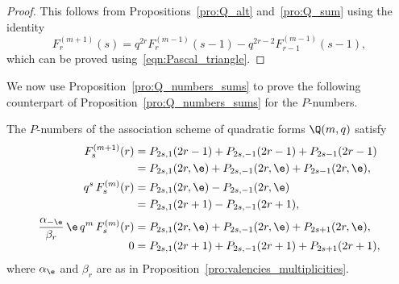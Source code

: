 \begin{proof}
This follows from Propositions~\ref{pro:Q_alt} and~\ref{pro:Q_sum} using the identity
\begin{equation}
F^{(m+1)}_{r}(s)=q^{2r}F^{(m-1)}_{r}(s-1)-q^{2r-2}F^{(m-1)}_{r-1}(s-1),   \label{eqn:F_identity}
\end{equation}
which can be proved using~\eqref{eqn:Pascal_triangle}.
\end{proof}
\par
We now use Proposition~\ref{pro:Q_numbers_sums} to prove the following counterpart of Proposition~\ref{pro:Q_numbers_sums} for the $P$-numbers.
\begin{prop}
\label{pro:P_numbers_sums}
The $P$-numbers of the association scheme of quadratic forms $\Q(m,q)$ satisfy
\begin{align}
F^{(m+1)}_s(r)&=P_{2s,1}(2r-1)+P_{2s,-1}(2r-1)+P_{2s-1}(2r-1)   \label{eqn:P_sum_1}\\
&=P_{2s,1}(2r,\e)+P_{2s,-1}(2r,\e)+P_{2s-1}(2r,\e),   \nonumber\\%
%
q^s\,F^{(m)}_s(r)&=P_{2s,1}(2r,\e)-P_{2s,-1}(2r,\e)   \label{eqn:P_sum_2}\\
&=P_{2s,1}(2r+1)-P_{2s,-1}(2r+1),   \nonumber\\[0.3ex]
%
\frac{\alpha_{-\e}}{\beta_r}\,\e\,q^m\,F^{(m)}_s(r)&=P_{2s,1}(2r,\e)+P_{2s,-1}(2r,\e)+P_{2s+1}(2r,\e),   \label{eqn:P_sum_3}\\[-1ex]
0&=P_{2s,1}(2r+1)+P_{2s,-1}(2r+1)+P_{2s+1}(2r+1),   \label{eqn:P_sum_4}
\end{align}
where $\alpha_\e$ and $\beta_r$ are as in Proposition~\ref{pro:valencies_multiplicities}.
\end{prop}

